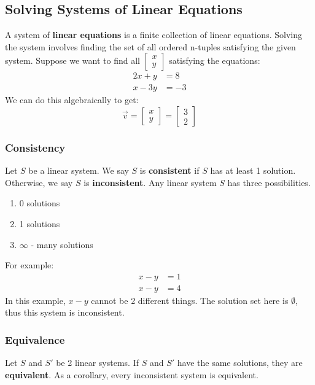 \documentclass[letterpaper, 12pt]{math}
\begin{document}
\subsection*{Solving Systems of Linear Equations}
A system of \textbf{linear equations} is a finite collection of linear
equations. Solving the system involves finding the set of all ordered n-tuples
satisfying the given system. Suppose we want to find all \( \begin{bmatrix}x \\
y\end{bmatrix} \) satisfying the equations:
\begin{align*}
  2x+y &= 8 \\
  x-3y &= -3
\end{align*}
We can do this algebraically to get:
\[ \vec{v} = \begin{bmatrix}x \\ y\end{bmatrix} = \begin{bmatrix}
  3 \\ 2
\end{bmatrix} \]

\subsubsection*{Consistency}
Let \( S \) be a linear system. We say \( S \) is \textbf{consistent} if \( S \)
has at least 1 solution. Otherwise, we say \( S \) is \textbf{inconsistent}.
Any linear system \( S \) has three possibilities.
\begin{enumerate}
  \item 0 solutions
  \item 1 solutions
  \item \( \infty \) - many solutions
\end{enumerate}
For example:
\begin{align*}
  x-y &= 1 \\
  x-y &= 4
\end{align*}
In this example, \( x-y \) cannot be 2 different things. The solution set here
is \( \emptyset \), thus this system is inconsistent.

\subsubsection*{Equivalence}
Let \( S \) and \( S' \) be 2 linear systems. If \( S \) and \( S' \) have the
same solutions, they are \textbf{equivalent}. As a corollary, every inconsistent
system is equivalent.
\end{document}
